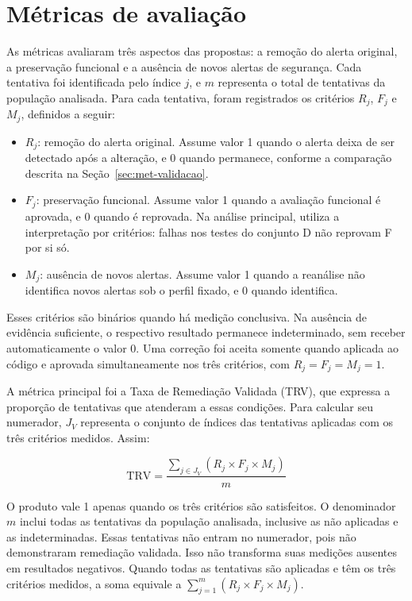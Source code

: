 \section{Métricas de avaliação}
\label{sec:met-metricas}

As métricas avaliaram três aspectos das propostas: a remoção do alerta original, a preservação funcional e a ausência de novos alertas de segurança. Cada tentativa foi identificada pelo índice $j$, e $m$ representa o total de tentativas da população analisada. Para cada tentativa, foram registrados os critérios $R_j$, $F_j$ e $M_j$, definidos a seguir:

\begin{itemize}
    \item $R_j$: remoção do alerta original. Assume valor 1 quando o alerta deixa de ser detectado após a alteração, e 0 quando permanece, conforme a comparação descrita na Seção~\ref{sec:met-validacao}.
    \item $F_j$: preservação funcional. Assume valor 1 quando a avaliação funcional é aprovada, e 0 quando é reprovada. Na análise principal, utiliza a interpretação por critérios: falhas nos testes do conjunto D não reprovam F por si só.
    \item $M_j$: ausência de novos alertas. Assume valor 1 quando a reanálise não identifica novos alertas sob o perfil fixado, e 0 quando identifica.
\end{itemize}

Esses critérios são binários quando há medição conclusiva. Na ausência de evidência suficiente, o respectivo resultado permanece indeterminado, sem receber automaticamente o valor 0. Uma correção foi aceita somente quando aplicada ao código e aprovada simultaneamente nos três critérios, com $R_j = F_j = M_j = 1$.

A métrica principal foi a Taxa de Remediação Validada (TRV), que expressa a proporção de tentativas que atenderam a essas condições. Para calcular seu numerador, $J_V$ representa o conjunto de índices das tentativas aplicadas com os três critérios medidos. Assim:

\[
\text{TRV} = \frac{\sum_{j \in J_V} (R_j \times F_j \times M_j)}{m}
\]

O produto vale 1 apenas quando os três critérios são satisfeitos. O denominador $m$ inclui todas as tentativas da população analisada, inclusive as não aplicadas e as indeterminadas. Essas tentativas não entram no numerador, pois não demonstraram remediação validada. Isso não transforma suas medições ausentes em resultados negativos. Quando todas as tentativas são aplicadas e têm os três critérios medidos, a soma equivale a $\sum_{j=1}^{m} (R_j \times F_j \times M_j)$.

